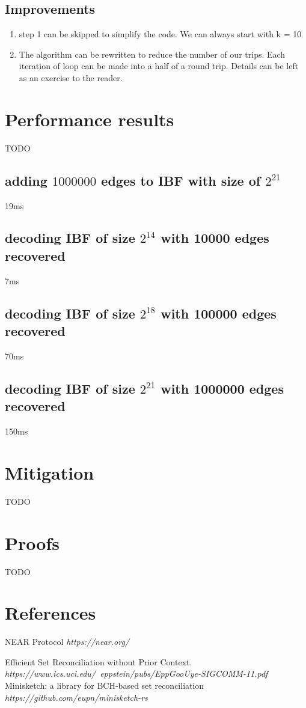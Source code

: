 \documentclass[11pt]{article}
\begin{document}
\subsection{Improvements}
\begin{enumerate}
\item step 1 can be skipped to simplify the code. We can always start with k = 10
\item The algorithm can be rewritten to reduce the number of our trips. Each iteration of loop can be made into a half of a round trip.
Details can be left as an exercise to the reader.
\end{enumerate}


\section{Performance results}
TODO
\subsection{adding $1000000$ edges to IBF with size of $2^{21}$}
19ms
\subsection{decoding IBF of size $2^{14}$ with 10000 edges recovered}
7ms
\subsection{decoding IBF of size $2^{18}$ with 100000 edges recovered}
70ms
\subsection{decoding IBF of size $2^{21}$ with 1000000 edges recovered}
150ms

\section{Mitigation}\label{sec:mitigation}
TODO

\section{Proofs}
TODO

\section{References}

\begin{thebibliography}{9}
NEAR Protocol
\textit{https://near.org/}

Efficient Set Reconciliation without Prior Context.
\textit{https://www.ics.uci.edu/~eppstein/pubs/EppGooUye-SIGCOMM-11.pdf}
Minisketch: a library for BCH-based set reconciliation
\textit{https://github.com/eupn/minisketch-rs}
\end{thebibliography}
\end{document}
